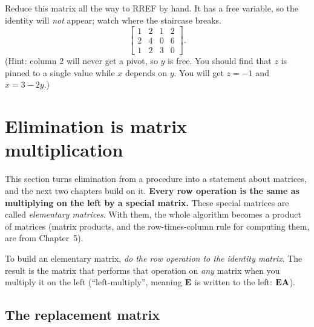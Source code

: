 \begin{labbox}
Reduce this matrix all the way to RREF by hand. It has a free variable, so the
identity will \emph{not} appear; watch where the staircase breaks.
\[
\left[\begin{array}{ccc|c}
1 & 2 & 1 & 2\\
2 & 4 & 0 & 6\\
1 & 2 & 3 & 0
\end{array}\right].
\]
(Hint: column 2 will never get a pivot, so $y$ is free. You should find that
$z$ is pinned to a single value while $x$ depends on $y$. You will get
$z=-1$ and $x=3-2y$.)
\end{labbox}

\section{Elimination is matrix multiplication}

This section turns elimination from a procedure into a statement about matrices,
and the next two chapters build on it. \textbf{Every
row operation is the same as multiplying on the left by a special
matrix.} These special matrices are called \emph{elementary matrices}. With them,
the whole algorithm becomes a product of matrices (matrix products, and the
row-times-column rule for computing them, are from Chapter~5).

To build an elementary matrix, \emph{do the row
operation to the identity matrix}. The result is the matrix that performs
that operation on \emph{any} matrix when you multiply it on the left
(``left-multiply'', meaning $\mathbf{E}$ is written to the left: $\mathbf{E}\mathbf{A}$).

\subsection{The replacement matrix}

